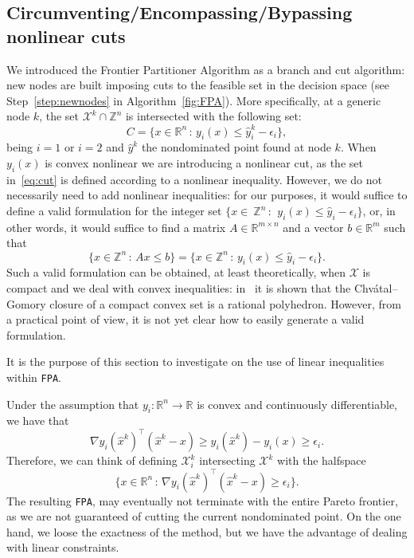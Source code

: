 \documentclass[preprint,12pt]{elsarticle}
\def\R{\mathbb{R}}
\def\Z{\mathbb{Z}}
\begin{document}
\subsection{Circumventing/Encompassing/Bypassing nonlinear cuts}
We introduced the Frontier Partitioner Algorithm as a branch and cut algorithm: new nodes are built imposing cuts
to the feasible set in the decision space (see Step~\ref{step:newnodes} in Algorithm~\ref{fig:FPA}).
More specifically, at a generic node $k$, the set $\mathcal{X}^k \cap \Z^n$ is intersected with the following set:
\begin{equation}\label{eq:cut}
C =\{x\in \R^n\,:\, y_i(x)\leq \hat y^k_i - \epsilon_i \},
\end{equation}
being $i=1$ or $i=2$ and $\hat y^k$ the nondominated point found at node $k$.
When $y_i(x)$ is convex nonlinear we are introducing a nonlinear cut, as
the set in~\eqref{eq:cut} is defined according to a nonlinear inequality.
However, we do not necessarily need to add nonlinear inequalities:
for our purposes, it would suffice to define a valid formulation for the integer
set $\{x\in~\Z^n\,:\,~y_i(x)\leq\hat y_i - \epsilon_i\}$,
or, in other words, it would suffice to find a matrix $A\in \R^{m\times n}$ and a vector $b\in \R^m$ such that
\begin{equation}\label{eq:lincuts}
\{x\in \Z^n\,:\, A x\leq b\} =  \{x\in \Z^n\,:\, y_i(x)\leq \hat y_i - \epsilon_i \}.
\end{equation}
Such a valid formulation can be obtained, at least theoretically, when $\mathcal{X}$ is compact and we deal with convex inequalities:
in~\cite{dadush:2011, dadush:2014} it is shown that
the Chv\'atal--Gomory closure of a compact convex set is a rational polyhedron.
However, from a practical point of view, it is not yet clear how to easily generate a valid formulation.

It is the purpose of this section to investigate on the use of linear inequalities within \texttt{FPA}.

Under the assumption that $y_i:\R^n \rightarrow \R$ is convex and continuously differentiable, we have that
 \[\nabla y_i(\hat x^k)^\top (\hat x^k - x) \geq y_i(\hat x^k) - y_i(x) \geq \epsilon_i.\]
Therefore, we can think of defining $\mathcal{X}^{k}_i$ intersecting $\mathcal{X}^k$ with the
halfspace \[\{x\in \R^n\,:\, \nabla y_i(\hat x^k)^\top (\hat x^k - x)\geq \epsilon_i\}.\]
The resulting \texttt{FPA}, may eventually not terminate with the entire Pareto frontier, as we are not guaranteed
of cutting the current nondominated point.
On the one hand, we loose the exactness of the method, but we have the advantage of dealing with linear constraints.
\end{document}
